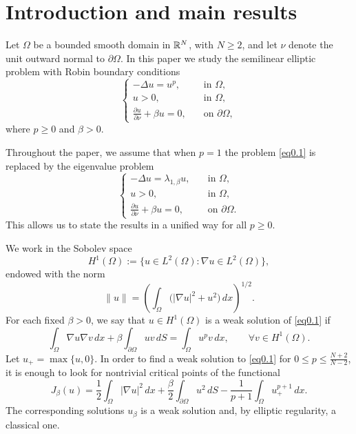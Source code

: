 \documentclass[12pt,reqno]{amsart}
\numberwithin{equation}{section}
\theoremstyle{definition}
\def\R{{\Bbb R}}
\begin{document}
\date{}
\maketitle

\section{Introduction and main results}

Let $\Omega$ be a bounded smooth domain in $\R^N$, with $N\ge2$, and let $\nu$ denote the unit outward normal to $\partial\Omega$. In this paper we study the semilinear elliptic problem with Robin boundary conditions
\begin{equation}\label{eq0.1}
\begin{cases}
-\Delta u=u^p,\quad &\text{in }\Omega,\\
u>0,\quad &\text{in }\Omega,\\
\frac{\partial u}{\partial \nu}+\beta u=0,\quad &\text{on }\partial\Omega,
\end{cases}
\end{equation}
where $p\ge0$ and $\beta>0$.

Throughout the paper, we assume that when $p=1$ the problem \eqref{eq0.1} is replaced by the eigenvalue problem
\begin{equation}\label{eig}
\begin{cases}
-\Delta u=\lambda_{1,\beta}u,\quad &\text{in }\Omega,\\
u>0,\quad &\text{in }\Omega,\\
\frac{\partial u}{\partial \nu}+\beta u=0,\quad &\text{on }\partial\Omega.
\end{cases}
\end{equation}
This allows us to state the results in a unified way for all $p \ge 0$.





We work in the Sobolev space
\[
H^1(\Omega):=\{u\in L^2(\Omega): \nabla u\in L^2(\Omega)\},
\]
endowed with the norm
\[
\|u\|=\left(\int_{\Omega}\bigl(|\nabla u|^2+u^2\bigr)\,dx\right)^{1/2}.
\]
For each fixed $\beta>0$, we say that $u\in H^1(\Omega)$ is a weak solution of \eqref{eq0.1} if
\[
\int_{\Omega}\nabla u\nabla v\,dx+\beta\int_{\partial\Omega}uv\,dS
=\int_{\Omega}u^p v\,dx,
\qquad \forall v\in H^1(\Omega).
\]
Let $u_+=\max\{u,0\}$. In order to find a weak solution to \eqref{eq0.1} for $0\le p\le \frac{N+2}{N-2}$, it is enough to look for nontrivial critical points of the functional
\[
J_\beta(u)=\frac12\int_{\Omega}|\nabla u|^2\,dx+\frac{\beta}{2}\int_{\partial\Omega}u^2\,dS
-\frac{1}{p+1}\int_{\Omega}u_+^{p+1}\,dx.
\]
The corresponding solutions $u_\beta$ is a weak solution and, by elliptic regularity, a classical one.
\end{document}
